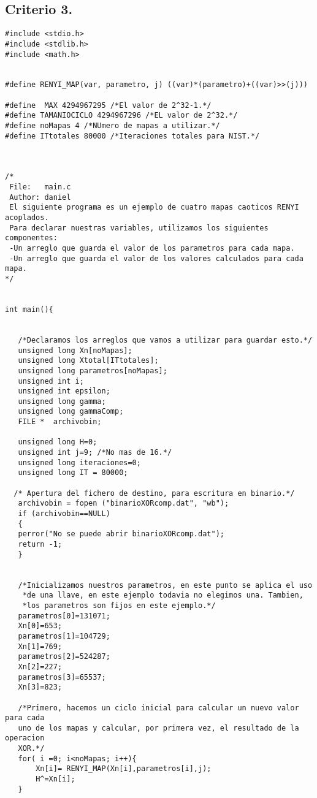 \documentclass[12pt,3p]{elsarticle}
\begin{document}
\subsection{Criterio 3.}
\begin{verbatim}
#include <stdio.h>
#include <stdlib.h>
#include <math.h>


#define RENYI_MAP(var, parametro, j) ((var)*(parametro)+((var)>>(j)))

#define  MAX 4294967295 /*El valor de 2^32-1.*/
#define TAMANIOCICLO 4294967296 /*EL valor de 2^32.*/
#define noMapas 4 /*NUmero de mapas a utilizar.*/
#define ITtotales 80000 /*Iteraciones totales para NIST.*/



/*
 File:   main.c
 Author: daniel
 El siguiente programa es un ejemplo de cuatro mapas caoticos RENYI acoplados.
 Para declarar nuestras variables, utilizamos los siguientes componentes:
 -Un arreglo que guarda el valor de los parametros para cada mapa.
 -Un arreglo que guarda el valor de los valores calculados para cada mapa.
*/


int main(){
 
   
   /*Declaramos los arreglos que vamos a utilizar para guardar esto.*/
   unsigned long Xn[noMapas];
   unsigned long Xtotal[ITtotales]; 
   unsigned long parametros[noMapas];
   unsigned int i;
   unsigned int epsilon;
   unsigned long gamma;
   unsigned long gammaComp;
   FILE *  archivobin; 

   unsigned long H=0; 
   unsigned int j=9; /*No mas de 16.*/
   unsigned long iteraciones=0;
   unsigned long IT = 80000;

  /* Apertura del fichero de destino, para escritura en binario.*/
   archivobin = fopen ("binarioXORcomp.dat", "wb");
   if (archivobin==NULL)
   {
   perror("No se puede abrir binarioXORcomp.dat");
   return -1;
   }
   

   /*Inicializamos nuestros parametros, en este punto se aplica el uso
    *de una llave, en este ejemplo todavia no elegimos una. Tambien,
    *los parametros son fijos en este ejemplo.*/
   parametros[0]=131071;
   Xn[0]=653;
   parametros[1]=104729;
   Xn[1]=769;
   parametros[2]=524287;
   Xn[2]=227;
   parametros[3]=65537;
   Xn[3]=823;
                   
   /*Primero, hacemos un ciclo inicial para calcular un nuevo valor para cada
   uno de los mapas y calcular, por primera vez, el resultado de la operacion
   XOR.*/
   for( i =0; i<noMapas; i++){
       Xn[i]= RENYI_MAP(Xn[i],parametros[i],j);
       H^=Xn[i];
   }
   

\end{verbatim}
\end{document}

